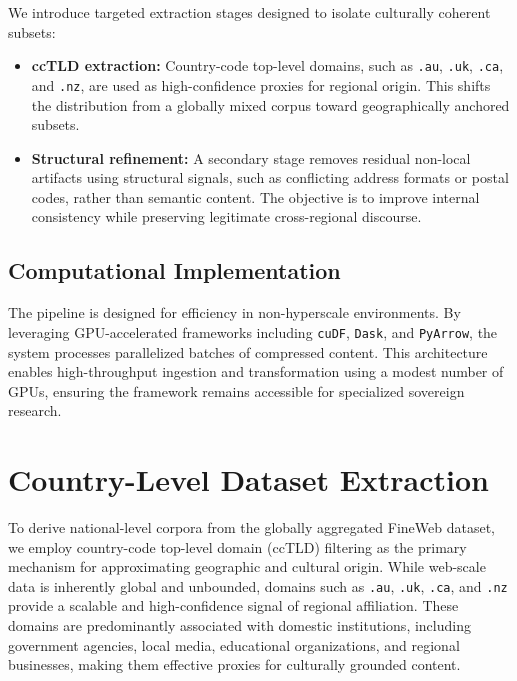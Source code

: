 \documentclass[11pt, a4paper]{article}
\begin{document}
We introduce targeted extraction stages designed to isolate culturally coherent subsets:

\begin{itemize}[noitemsep]
    \item \textbf{ccTLD extraction:} Country-code top-level domains, such as \texttt{.au}, \texttt{.uk}, \texttt{.ca}, and \texttt{.nz}, are used as high-confidence proxies for regional origin. This shifts the distribution from a globally mixed corpus toward geographically anchored subsets.
    \item \textbf{Structural refinement:} A secondary stage removes residual non-local artifacts using structural signals, such as conflicting address formats or postal codes, rather than semantic content. The objective is to improve internal consistency while preserving legitimate cross-regional discourse.
\end{itemize}

\subsection{Computational Implementation}

The pipeline is designed for efficiency in non-hyperscale environments. By leveraging GPU-accelerated frameworks including \texttt{cuDF}, \texttt{Dask}, and \texttt{PyArrow}, the system processes parallelized batches of compressed content. This architecture enables high-throughput ingestion and transformation using a modest number of GPUs, ensuring the framework remains accessible for specialized sovereign research.

\section{Country-Level Dataset Extraction}

To derive national-level corpora from the globally aggregated FineWeb dataset, we employ country-code top-level domain (ccTLD) filtering as the primary mechanism for approximating geographic and cultural origin. While web-scale data is inherently global and unbounded, domains such as \texttt{.au}, \texttt{.uk}, \texttt{.ca}, and \texttt{.nz} provide a scalable and high-confidence signal of regional affiliation. These domains are predominantly associated with domestic institutions, including government agencies, local media, educational organizations, and regional businesses, making them effective proxies for culturally grounded content.
\end{document}
